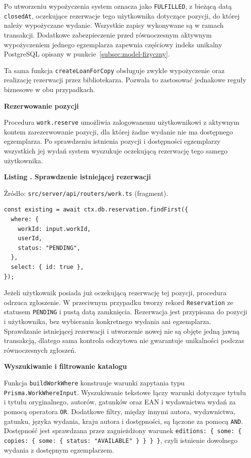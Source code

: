\documentclass[11pt, a4paper]{article}
\begin{document}
Po utworzeniu wypożyczenia system oznacza jako \texttt{FULFILLED}, z bieżącą datą \texttt{closedAt}, oczekujące rezerwacje tego użytkownika dotyczące pozycji, do której należy wypożyczane wydanie. Wszystkie zapisy wykonywane są w ramach transakcji. Dodatkowe zabezpieczenie przed równoczesnym aktywnym wypożyczeniem jednego egzemplarza zapewnia częściowy indeks unikalny PostgreSQL opisany w punkcie~\ref{subsec:model-fizyczny}.

Ta sama funkcja \texttt{createLoanForCopy} obsługuje zwykłe wypożyczenie oraz realizację rezerwacji przez bibliotekarza. Pozwala to zastosować jednakowe reguły biznesowe w obu przypadkach.

\noindent\textbf{Rezerwowanie pozycji}

Procedura \texttt{work.reserve} umożliwia zalogowanemu użytkownikowi z aktywnym kontem zarezerwowanie pozycji, dla której żadne wydanie nie ma dostępnego egzemplarza. Po sprawdzeniu istnienia pozycji i dostępności egzemplarzy wszystkich jej wydań system wyszukuje oczekującą rezerwację tego samego użytkownika.

\noindent\textbf{Listing \thebdcode. Sprawdzenie istniejącej rezerwacji}
\label{lst:reserve-check}
\par\nopagebreak
{\footnotesize
\noindent Źródło: \texttt{src/server/api/routers/work.ts} (fragment).
\par\nopagebreak
\begin{verbatim}
const existing = await ctx.db.reservation.findFirst({
  where: {
    workId: input.workId,
    userId,
    status: "PENDING",
  },
  select: { id: true },
});
\end{verbatim}
}

Jeżeli użytkownik posiada już oczekującą rezerwację tej pozycji, procedura odrzuca zgłoszenie. W przeciwnym przypadku tworzy rekord \texttt{Reservation} ze statusem \texttt{PENDING} i pustą datą zamknięcia. Rezerwacja jest przypisana do pozycji i użytkownika, bez wybierania konkretnego wydania ani egzemplarza. Sprawdzanie istniejącej rezerwacji i utworzenie nowej nie są objęte jedną jawną transakcją, dlatego sama kontrola odczytowa nie gwarantuje unikalności podczas równoczesnych zgłoszeń.

\noindent\textbf{Wyszukiwanie i filtrowanie katalogu}

Funkcja \texttt{buildWorkWhere} konstruuje warunki zapytania typu \texttt{Prisma.WorkWhereInput}. Wyszukiwanie tekstowe łączy warunki dotyczące tytułu i tytułu oryginalnego, autorów, gatunków oraz EAN i wydawnictwa wydań za pomocą operatora \texttt{OR}. Dodatkowe filtry, między innymi autora, wydawnictwa, gatunku, języka wydania, kraju autora i dostępności, są łączone za pomocą \texttt{AND}. Dostępność jest sprawdzana przez zagnieżdżony warunek \texttt{editions: \{ some: \{ copies: \{ some: \{ status: "AVAILABLE" \} \} \} \}}, czyli istnienie dowolnego wydania z dostępnym egzemplarzem.
\end{document}
